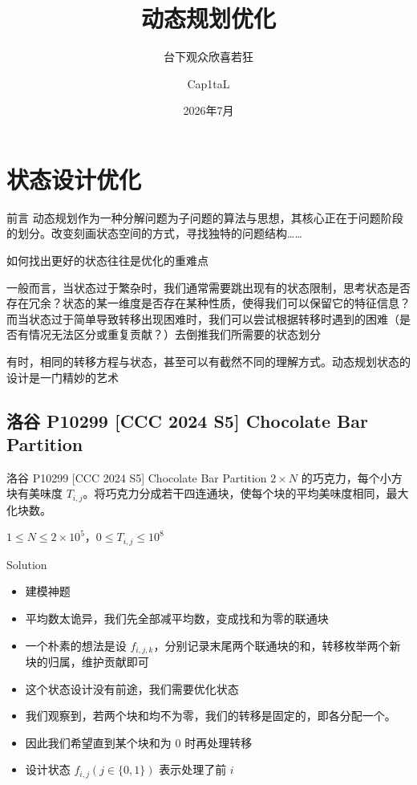 ﻿\documentclass[aspectratio=169]{ctexbeamer}
\author{Cap1taL}
\title{动态规划优化}
\subtitle{台下观众欣喜若狂}
\date{2026年7月}
\begin{document}
\kaishu

\begin{frame}
    \titlepage
\end{frame}



\section{状态设计优化}

\begin{frame}{前言}
    动态规划作为一种分解问题为子问题的算法与思想，其核心正在于问题阶段的划分。改变刻画状态空间的方式，寻找独特的问题结构……
    
    如何找出更好的状态往往是优化的重难点

    一般而言，当状态过于繁杂时，我们通常需要跳出现有的状态限制，思考状态是否存在冗余？状态的某一维度是否存在某种性质，使得我们可以保留它的特征信息？而当状态过于简单导致转移出现困难时，我们可以尝试根据转移时遇到的困难（是否有情况无法区分或重复贡献？）去倒推我们所需要的状态划分

    有时，相同的转移方程与状态，甚至可以有截然不同的理解方式。动态规划状态的设计是一门精妙的艺术
    
\end{frame}

\subsection{洛谷 P10299 [CCC 2024 S5] Chocolate Bar Partition}

\begin{frame}{洛谷 P10299 [CCC 2024 S5] Chocolate Bar Partition}
      $2\times N$ 的巧克力，每个小方块有美味度 $T_{i,j}$。将巧克力分成若干四连通块，使每个块的平均美味度相同，最大化块数。
      
      $1\le N\le 2\times 10^5$，$0\le T_{i,j}\le 10^8$
\end{frame}

\begin{frame}{Solution}
    \begin{itemize}
        \item 建模神题
        \item 平均数太诡异，我们先全部减平均数，变成找和为零的联通块
        \item 一个朴素的想法是设 $f_{i,j,k}$，分别记录末尾两个联通块的和，转移枚举两个新块的归属，维护贡献即可
        \item 这个状态设计没有前途，我们需要优化状态
        \item 我们观察到，若两个块和均不为零，我们的转移是固定的，即各分配一个。
        \item 因此我们希望直到某个块和为 $ 0 $ 时再处理转移
        \item 设计状态 $f_{i,j}(j\in\{0,1\})$ 表示处理了前 $i$
    \end{itemize}
\end{frame}
\end{document}
